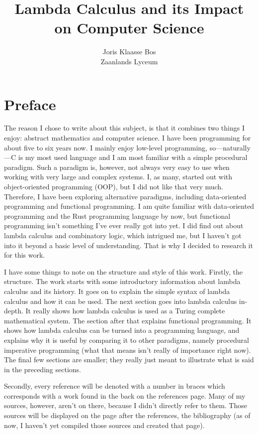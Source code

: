 \documentclass[11pt]{article}
\title{Lambda Calculus and its Impact on Computer Science}
\author{Joris Klaasse Bos\\ Zaanlands Lyceum}
\begin{document}
\maketitle
\newpage

\section*{Preface}


The reason I chose to write about this subject, is that it combines two things
I enjoy: abstract mathematics and computer science. I have been programming for
about five to six years now. I mainly enjoy low-level programming,
so---naturally---C is my most used language and I am most familiar with a
simple procedural paradigm. Such a paradigm is, however, not always very easy
to use when working with very large and complex systems. I, as many, started
out with object-oriented programming (OOP), but I did not like that very much.
Therefore, I have been exploring alternative paradigms, including data-oriented
programming and functional programming. I am quite familiar with data-oriented
programming and the Rust programming language by now, but functional
programming isn't something I've ever really got into yet. I did find out about
lambda calculus and combinatory logic, which intrigued me, but I haven’t got
into it beyond a basic level of understanding. That is why I decided to
research it for this work. 

I have some things to note on the structure and style of this work. Firstly,
the structure. The work starts with some introductory information about lambda
calculus and its history. It goes on to explain the simple syntax of lambda
calculus and how it can be used. The next section goes into lambda calculus
in-depth. It really shows how lambda calculus is used as a Turing complete
mathematical system. The section after that explains functional programming. It
shows how lambda calculus can be turned into a programming language, and
explains why it is useful by comparing it to other paradigms, namely procedural
imperative programming (what that means isn't really of importance right now).
The final few sections are smaller; they really just meant to illustrate what
is said in the preceding sections.

Secondly, every reference will be denoted with a number in braces which
corresponds with a work found in the back on the references page. Many of my
sources, however, aren't on there, because I didn't directly refer to them.
Those sources will be displayed on the page after the references, the
bibliography (as of now, I haven't yet compiled those sources and created that
page).
\end{document}
